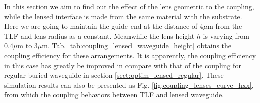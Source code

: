 In this section we aim to find out the effect of the lens geometric to the coupling, while the lensed interface is made from the same material with the substrate. Here we are going to maintain the guide end at the distance of $4\mu$m from the TLF and lens radius as a constant. Meanwhile the lens height $h$ is varying from $0.4\mu$m to $3\mu$m. Tab. \ref{tab:coupling_lensed_waveguide_height} obtains the coupling efficiency for these arrangements. It is apparently, the coupling efficiency in this case has greatly be improved in compare with that of the coupling for regular buried waveguide in section \ref{sect:optim_lensed_regular}. These simulation results can also be presented as Fig. \ref{fig:coupling_lenses_curve_hxx}, from which the coupling behaviors between TLF and lensed waveguide.\\  
  
